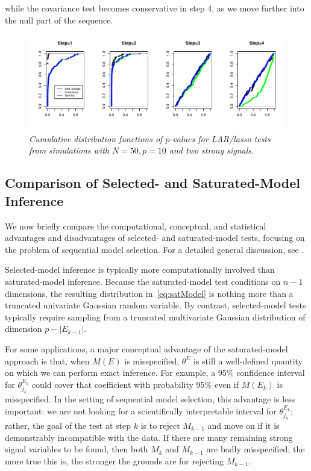 \documentclass{article}
\begin{document}
while the covariance test becomes conservative in step 4, as we move further into the null part of the sequence.
\begin{figure}
  \includegraphics[width=\textwidth]{figs/larexample.pdf}
  \caption[fig:larexample]{\em  Cumulative distribution functions of $p$-values for LAR/lasso tests from simulations with $N=50,  p=10$ and two strong signals.}
  \label{fig:larexample}
\end{figure}

\subsection{Comparison of Selected- and Saturated-Model Inference}\label{sec:bivariate}

We now briefly compare the computational, conceptual, and statistical advantages and disadvantages of selected- and saturated-model tests, focusing on the problem of sequential model selection. For a detailed general discussion, see \citet[][Section 5]{fithian2014optimal}.

Selected-model inference is typically more computationally involved than saturated-model inference. Because the saturated-model test conditions on $n-1$ dimensions, the resulting distribution in~\eqref{eq:satModel} is nothing more than a truncated univariate Gaussian random variable. By contrast, selected-model tests typically require sampling from a truncated multivariate Gaussian distribution of dimension $p-|E_{k-1}|$.

For some applications, a major conceptual advantage of the saturated-model approach is that, when $M(E)$ is misspecified, $\theta^{E}$ is still a well-defined quantity on which we can perform exact inference. For example, a 95\% confidence interval for $\theta_{j_k}^{E_k}$ could cover that coefficient with probability 95\% even if $M(E_k)$ is misspecified. In the setting of sequential model selection, this advantage is less important: we are not looking for a scientifically interpretable interval for $\theta_{j_k}^{E_k}$; rather, the goal of the test at step $k$ is to reject $M_{k-1}$ and move on if it is demonstrably incompatible with the data. If there are many remaining strong signal variables to be found, then both $M_k$ and $M_{k-1}$ are badly misspecified; the more true this is, the stronger the grounds are for rejecting $M_{k-1}$.
\end{document}
